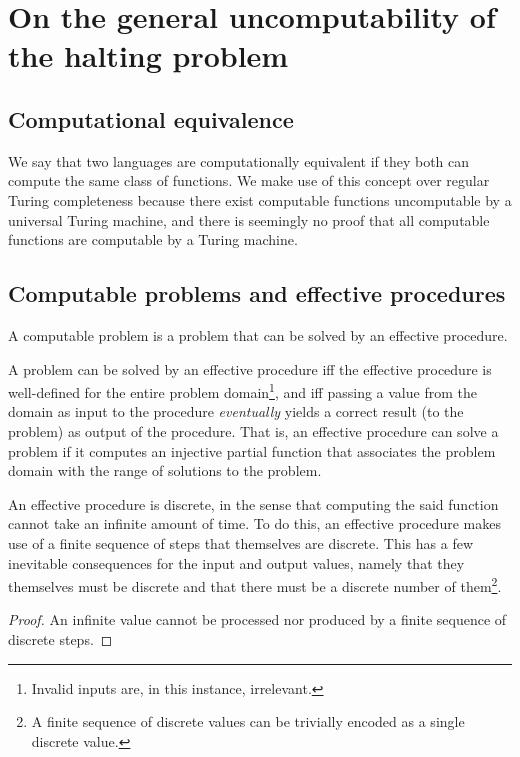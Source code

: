 \chapter{On the general uncomputability of the halting problem}

\section{Computational equivalence}

We say that two languages are computationally equivalent if they both can
compute the same class of functions. We make use of this concept over regular
Turing completeness because there exist computable functions uncomputable by a
universal Turing machine, and there is seemingly no proof that all computable
functions are computable by a Turing machine.

\section{Computable problems and effective procedures}

A computable problem is a problem that can be solved by an effective procedure.

A problem can be solved by an effective procedure iff the effective procedure
is well-defined for the entire problem domain\footnote{Invalid inputs are, in
this instance, irrelevant.}, and iff passing a value from the domain as input
to the procedure \emph{eventually} yields a correct result (to the problem) as
output of the procedure. That is, an effective procedure can solve a problem if
it computes an injective partial function that associates the problem domain
with the range of solutions to the problem.

An effective procedure is discrete, in the sense that computing the said
function cannot take an infinite amount of time. To do this, an effective
procedure makes use of a finite sequence of steps that themselves are discrete.
This has a few inevitable consequences for the input and output values, namely
that they themselves must be discrete and that there must be a discrete number
of them\footnote{A finite sequence of discrete values can be trivially encoded
as a single discrete value.}.

\begin{proof} An infinite value cannot be processed nor produced by a finite
sequence of discrete steps.\end{proof}

